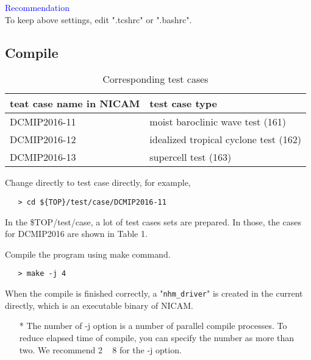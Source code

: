 \documentclass[a4paper]{article}
\begin{document}
 \noindent \textcolor{blue}{{\sf Recommendation}} \\
 To keep above settings, edit ".tcshrc" or ".bashrc".


\subsection{Compile}
 \begin{table}[b]
 \begin{center}
 \caption{Corresponding test cases}
 \begin{tabularx}{150mm}{|l|X|} \hline
 \rowcolor[gray]{0.9} teat case name in NICAM & test case type \\ \hline
  DCMIP2016-11 & moist baroclinic wave test (161)       \\ \hline
  DCMIP2016-12 & idealized tropical cyclone test (162)  \\ \hline
  DCMIP2016-13 & supercell test (163)                   \\ \hline
 \end{tabularx}
 \end{center}
 \end{table}

 Change directly to test case directly, for example,
 \begin{verbatim}
   > cd ${TOP}/test/case/DCMIP2016-11
 \end{verbatim}

 \noindent In the \${TOP}/test/case, a lot of test cases sets are prepared.
 In those, the cases for DCMIP2016 are shown in Table 1.

 \noindent Compile the program using make command.
 \begin{verbatim}
   > make -j 4
 \end{verbatim}
 When the compile is finished correctly, a "\verb|nhm_driver|" is created
 in the current directly, which is an executable binary of NICAM.

 \begin{itemize}
   \item[*] The number of -j option is a number of parallel compile processes.
    To reduce elapsed time of compile, you can specify the number
    as more than two. We recommend 2 ~ 8 for the -j option.
 \end{itemize}
\end{document}
